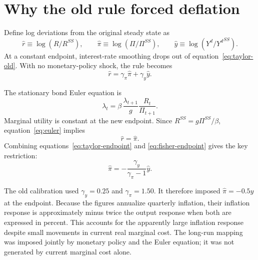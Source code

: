\documentclass[10pt]{article}
\newcommand{\ssval}[1]{{#1}^{SS}}
\begin{document}
\section{Why the old rule forced deflation}

Define log deviations from the original steady state as
\[
    \widehat r \equiv \log(R/\ssval{R}), \qquad
    \widehat\pi \equiv \log(\Pi/\ssval{\Pi}), \qquad
    \widehat y \equiv \log(Y^d/\ssval{Y^d}).
\]
At a constant endpoint, interest-rate smoothing drops out of
equation~\eqref{eq:taylor-old}.
With no monetary-policy shock, the rule becomes
\begin{equation}\label{eq:taylor-endpoint}
    \widehat r = \gamma_\pi\widehat\pi+\gamma_y\widehat y.
\end{equation}

The stationary bond Euler equation is
\begin{equation}\label{eq:euler}
    \lambda_t
    = \beta\,\frac{\lambda_{t+1}}{g}\frac{R_t}{\Pi_{t+1}}.
\end{equation}
Marginal utility is constant at the new endpoint.
Since $\ssval{R}=g\ssval{\Pi}/\beta$, equation~\eqref{eq:euler} implies
\begin{equation}\label{eq:fisher-endpoint}
    \widehat r=\widehat\pi.
\end{equation}
Combining equations~\eqref{eq:taylor-endpoint} and
\eqref{eq:fisher-endpoint} gives the key restriction:
\begin{equation}\label{eq:puzzle}
    \boxed{
    \widehat\pi
    =-\frac{\gamma_y}{\gamma_\pi-1}\widehat y
    }.
\end{equation}

The old calibration used $\gamma_y=0.25$ and $\gamma_\pi=1.50$.
It therefore imposed $\widehat\pi=-0.5\widehat y$ at the endpoint.
Because the figures annualize quarterly inflation, their inflation response is
approximately minus twice the output response when both are expressed in percent.
This accounts for the apparently large inflation response despite small movements in
current real marginal cost.
The long-run mapping was imposed jointly by monetary policy and the Euler equation;
it was not generated by current marginal cost alone.
\end{document}
